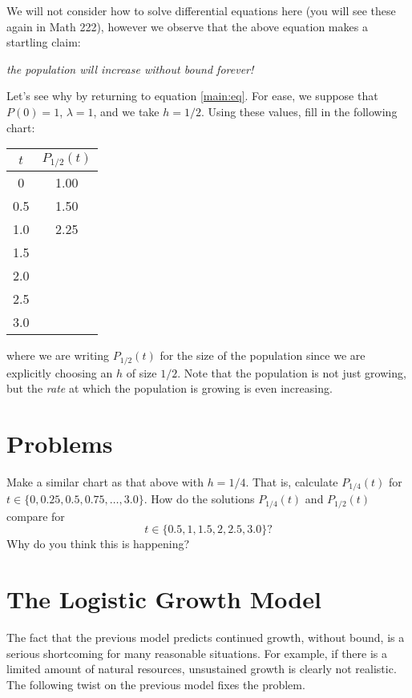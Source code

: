 We will not consider how to solve differential equations here (you
will see these again in Math 222), however we observe that the above
equation makes a startling claim:


\begin{center}
  {\em the population will increase without bound forever!}
\end{center}

Let's see why by returning to equation \eqref{main:eq}.  For ease, we
suppose that $P(0) = 1$, $\lambda = 1$, and we take $h = 1/2$.  Using
these values, fill in the following chart:

\begin{center}
  \begin{tabular}{|c|c|}
    \hline
    $t$ & $P_{1/2}(t)$\\ \hline
    0 & 1.00 \\ \hline
    0.5 & 1.50  \\ \hline
    1.0 & 2.25 \\ \hline
    1.5 & \\ \hline
    2.0 & \\ \hline
    2.5 & \\ \hline
    3.0 & \\ \hline
  \end{tabular}
\end{center}
where we are writing $P_{1/2}(t)$ for the size of the population since
we are explicitly choosing an $h$ of size $1/2$.  Note that the
population is not just growing, but the {\em rate} at which the
population is growing is even increasing.

\section{Problems}

\problemfont
\problem
Make a similar chart as that above with $h = 1/4$.  That is,
calculate $P_{1/4}(t)$ for $t \in \{0,0.25, 0.5, 0.75, \dots,
3.0\}$. How do the solutions $P_{1/4}(t)$ and $P_{1/2}(t)$ compare
for
\[
t \in \{0.5, 1, 1.5, 2, 2.5, 3.0\}?
\]
Why do you think this is happening?
\noproblemfont

\section{The Logistic Growth Model}

The fact that the previous model predicts continued growth, without
bound, is a serious shortcoming for many reasonable situations.  For
example, if there is a limited amount of natural resources,
unsustained growth is clearly not realistic.  The following twist on
the previous model fixes the problem.

